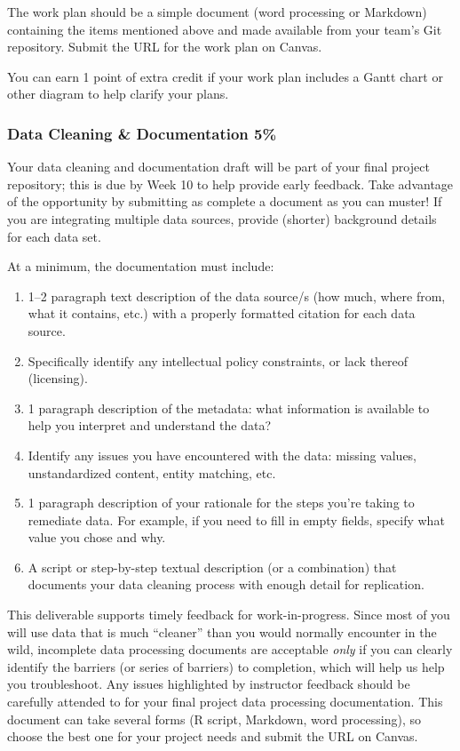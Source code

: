 \documentclass[11pt]{article}
\begin{document}
The work plan should be a simple document (word processing or Markdown) containing the items mentioned above and made available from your team's Git repository.
Submit the URL for the work plan on Canvas.

You can earn 1 point of extra credit if your work plan includes a Gantt chart or other diagram to help clarify your plans.

\subsubsection{Data Cleaning \& Documentation  5\%}
Your data cleaning and documentation draft will be part of your final project repository; this is due by Week 10 to help provide early feedback.
Take advantage of the opportunity by submitting as complete a document as you can muster!
If you are integrating multiple data sources, provide (shorter) background details for each data set.

At a minimum, the documentation must include:
\begin{enumerate}
	\item 1--2 paragraph text description of the data source/s (how much, where from, what it contains, etc.) with a properly formatted citation for each data source.
	\item Specifically identify any intellectual policy constraints, or lack thereof (licensing).
	\item 1 paragraph description of the metadata: what information is available to help you interpret and understand the data?
	\item Identify any issues  you have encountered with the data: missing values, unstandardized content, entity matching, etc.
	\item 1 paragraph description of your rationale for the steps you're taking to remediate data. For example, if you need to fill in empty fields, specify what value you chose and why.
	\item A script or step-by-step textual description (or a combination) that documents your data cleaning process with enough detail for replication.
\end{enumerate}

This deliverable supports timely feedback for work-in-progress.
Since most of you will use data that is much ``cleaner'' than you would normally encounter in the wild, incomplete data processing documents are acceptable \textit{only} if you can clearly identify the barriers (or series of barriers) to completion, which will help us help you troubleshoot.
Any issues highlighted by instructor feedback should be carefully attended to for your final project data processing documentation.
This document can take several forms (R script, Markdown, word processing), so choose the best one for your project needs and submit the URL on Canvas.
\end{document}
